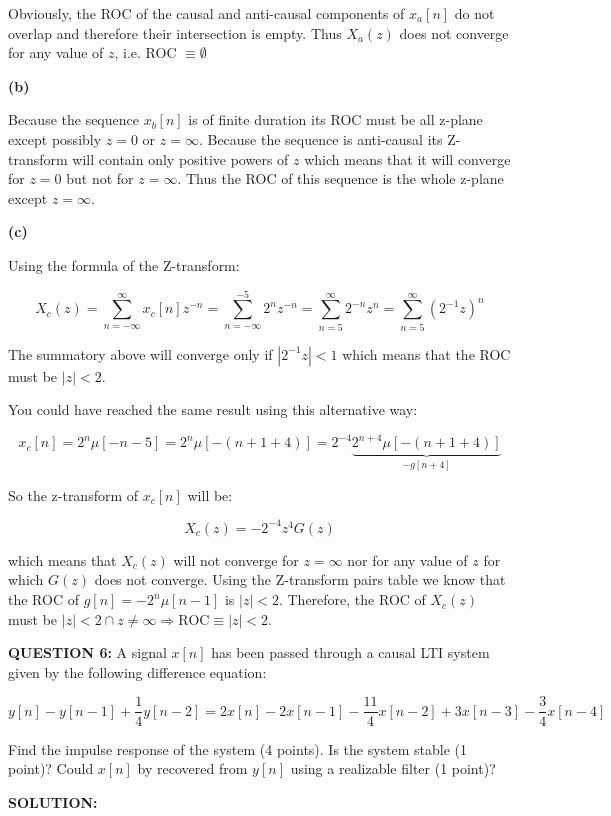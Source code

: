 \documentclass[a4paper,11pt,oneside]{article}
\begin{document}
Obviously, the ROC of the causal and anti-causal components of $x_a[n]$ do not overlap and therefore their intersection is empty. Thus $X_a(z)$ does not converge for any value of $z$, i.e. ROC $\equiv \emptyset$

\textbf{(b)}

Because the sequence $x_b[n]$ is of finite duration its ROC must be all z-plane except possibly $z=0$ or $z=\infty$. Because the sequence is anti-causal its Z-transform will contain only positive powers of $z$ which means that it will converge for $z=0$ but not for $z=\infty$. Thus the ROC of this sequence is the whole z-plane except $z=\infty$.

\textbf{(c)}

Using the formula of the Z-transform:

\[
X_c(z)=\sum_{n=-\infty}^{\infty}x_c[n]z^{-n}=\sum_{n=-\infty}^{-5}2^nz^{-n}=\sum_{n=5}^{\infty}2^{-n}z^n=\sum_{n=5}^{\infty}(2^{-1}z)^n
\]

The summatory above will converge only if $|2^{-1}z|<1$ which means that the ROC must be $|z|<2$.

You could have reached the same result using this alternative way:

\[
x_c[n]=2^n\mu[-n-5]=2^n\mu[-(n+1+4)]=2^{-4}\underbrace{2^{n+4}\mu[-(n+1+4)]}_{-g[n+4]}
\]

So the z-transform of $x_c[n]$ will be:

\[
X_c(z)=-2^{-4}z^{4}G(z)
\]

which means that $X_c(z)$ will not converge for $z=\infty$ nor for any value of $z$ for which $G(z)$ does not converge. Using the Z-transform pairs table we know that the ROC of $g[n]=-2^n\mu[n-1]$ is $|z|<2$. Therefore, the ROC of $X_c(z)$ must be $|z|<2 \cap z\neq \infty \Rightarrow \textrm{ROC} \equiv |z|<2$.

\vspace{1cm}

\textbf{QUESTION 6:} A signal $x[n]$ has been passed through a causal LTI system given by the following difference equation:

\[
y[n]-y[n-1]+\frac{1}{4}y[n-2]=2x[n]-2x[n-1]-\frac{11}{4}x[n-2]+3x[n-3]-\frac{3}{4}x[n-4]
\]

Find the impulse response of the system (4 points). Is the system stable (1 point)? Could $x[n]$ by recovered from $y[n]$ using a realizable filter (1 point)?

\vspace{1cm}

\textbf{SOLUTION:}
\end{document}
